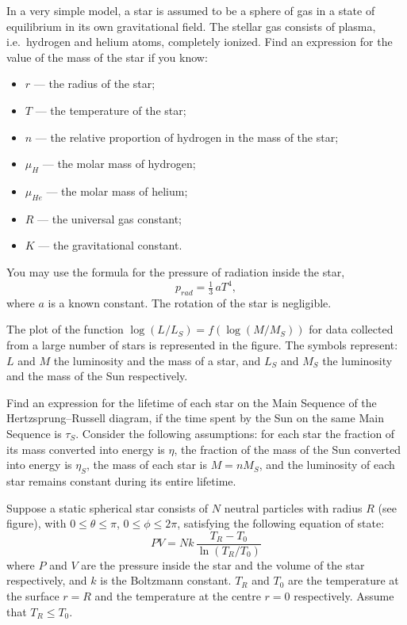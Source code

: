In a very simple model, a star is assumed to be a sphere of gas in a state of
equilibrium in its own gravitational field. The stellar gas consists of plasma,
i.e.\ hydrogen and helium atoms, completely ionized. Find an expression for the
value of the mass of the star if you know:
\begin{itemize}\itemsep1pt
\item $r$ --- the radius of the star;
\item $T$ --- the temperature of the star;
\item $n$ --- the relative proportion of hydrogen in the mass of the star;
\item $\mu_H$ --- the molar mass of hydrogen;
\item $\mu_{He}$ --- the molar mass of helium;
\item $R$ --- the universal gas constant;
\item $K$ --- the gravitational constant.
\end{itemize}
You may use the formula for the pressure of radiation inside the star,
\[ p_{rad} = \tfrac{1}{3}\,a T^4, \]
where $a$ is a known constant. The rotation of the star is negligible.

The plot of the function $\log(L/L_S) = f\!\left(\log(M/M_S)\right)$ for data
collected from a large number of stars is represented in the figure. The symbols
represent: $L$ and $M$ the luminosity and the mass of a star, and $L_S$ and $M_S$
the luminosity and the mass of the Sun respectively.

Find an expression for the lifetime of each star on the Main Sequence of the
Hertzsprung--Russell diagram, if the time spent by the Sun on the same Main
Sequence is $\tau_S$. Consider the following assumptions: for each star the
fraction of its mass converted into energy is $\eta$, the fraction of the mass
of the Sun converted into energy is $\eta_S$, the mass of each star is
$M = nM_S$, and the luminosity of each star remains constant during its entire
lifetime.

Suppose a static spherical star consists of $N$ neutral particles with radius $R$
(see figure), with $0 \le \theta \le \pi$, $0 \le \phi \le 2\pi$, satisfying the
following equation of state:
\begin{equation}
  PV = N k \,\frac{T_R - T_0}{\ln(T_R/T_0)}
\end{equation}
where $P$ and $V$ are the pressure inside the star and the volume of the star
respectively, and $k$ is the Boltzmann constant. $T_R$ and $T_0$ are the
temperature at the surface $r = R$ and the temperature at the centre $r = 0$
respectively. Assume that $T_R \le T_0$.

